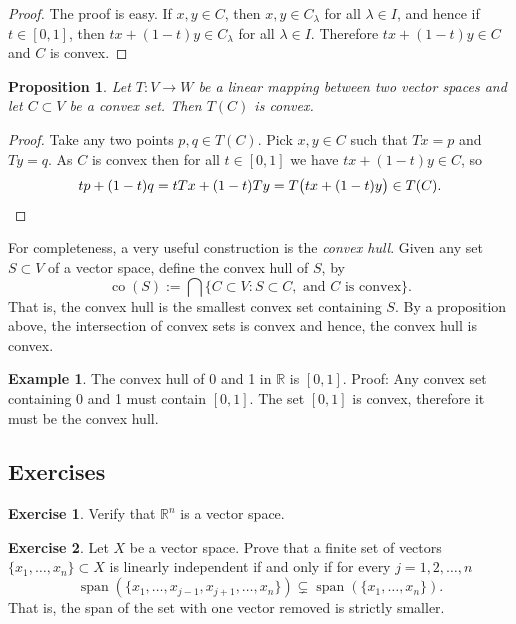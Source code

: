 \documentclass[12pt]{book}
\newcommand{\R}{{\mathbb{R}}}
\newcommand{\spn}{\operatorname{span}}
\newcommand{\myindex}[1]{#1\index{#1}}
\theoremstyle{plain}
\newtheorem{prop}[thm]{Proposition}
\theoremstyle{remark}
\theoremstyle{definition}
\theoremstyle{exercise}
\newtheorem{exercise}{Exercise}[section]
\theoremstyle{example}
\newtheorem{example}[thm]{Example}
\begin{document}
\begin{proof}
The proof is easy.  If $x, y \in C$, then $x,y \in C_\lambda$ for all
$\lambda \in I$, and hence if $t \in [0,1]$, then $tx + (1-t)y \in
C_\lambda$ for all $\lambda \in I$.  Therefore $tx + (1-t)y \in C$ and $C$
is convex.
\end{proof}

\begin{prop}
Let $T \colon V \to W$ be a linear mapping between two vector spaces and
let $C \subset V$ be a convex set.  Then $T(C)$ is convex.
\end{prop}

\begin{proof}
Take any two points $p,q \in T(C)$.  Pick $x,y \in C$ such that
$Tx = p$ and $Ty=q$.  As $C$ is convex then for all $t \in [0,1]$
we have $tx+(1-t)y \in C$, so
\begin{equation*}
tp+(1-t)q 
=
tTx+(1-t)Ty
=
T\bigl(tx+(1-t)y\bigr)
\in T(C) .  \qedhere
\end{equation*}
\end{proof}

For completeness, a very useful construction is the
\emph{\myindex{convex hull}}.  Given any set $S \subset V$ of a vector
space, define the convex hull of $S$, by
\begin{equation*}
\operatorname{co}(S) :=
\bigcap \{ C \subset V : S \subset C, \text{ and $C$ is convex} \} .
\end{equation*}
That is, the convex hull is the smallest convex set containing $S$.  
By a proposition above, the intersection of convex sets is convex and
hence, the convex hull is convex.

\begin{example}
The convex hull of 0 and 1 in $\R$ is $[0,1]$.  Proof:
Any convex set containing 0 and 1 must contain $[0,1]$.  The set $[0,1]$
is convex, therefore it must be the convex hull.
\end{example}

\subsection{Exercises}

\begin{exercise}
Verify that $\R^n$ is a vector space.
\end{exercise}

\begin{exercise}
Let $X$ be a vector space.
Prove that a finite set of vectors $\{ x_1,\ldots,x_n \} \subset X$ 
is linearly independent if and only if for every $j=1,2,\ldots,n$
\begin{equation*}
\spn( \{ x_1,\ldots,x_{j-1},x_{j+1},\ldots,x_n \}) \subsetneq
\spn( \{ x_1,\ldots,x_n \}) .
\end{equation*}
That is, the span of the set with one vector removed is strictly smaller.
\end{exercise}
\end{document}

